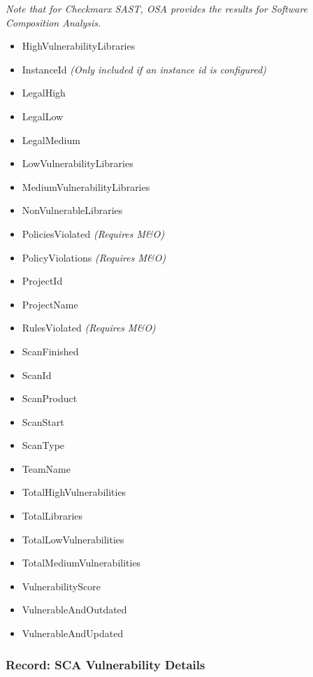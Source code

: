 \textit{Note that for Checkmarx SAST, OSA provides the results for Software Composition Analysis.}

\begin{itemize}
    \item HighVulnerabilityLibraries
    \item InstanceId \textit{(Only included if an instance id is configured)}
    \item LegalHigh
    \item LegalLow
    \item LegalMedium
    \item LowVulnerabilityLibraries
    \item MediumVulnerabilityLibraries
    \item NonVulnerableLibraries
    \item PoliciesViolated \textit{(Requires M\&O)}
    \item PolicyViolations \textit{(Requires M\&O)}
    \item ProjectId
    \item ProjectName
    \item RulesViolated \textit{(Requires M\&O)}
    \item ScanFinished
    \item ScanId
    \item ScanProduct
    \item ScanStart
    \item ScanType
    \item TeamName
    \item TotalHighVulnerabilities
    \item TotalLibraries
    \item TotalLowVulnerabilities
    \item TotalMediumVulnerabilities
    \item VulnerabilityScore
    \item VulnerableAndOutdated
    \item VulnerableAndUpdated
\end{itemize}

\subsubsection{Record: SCA Vulnerability Details}


